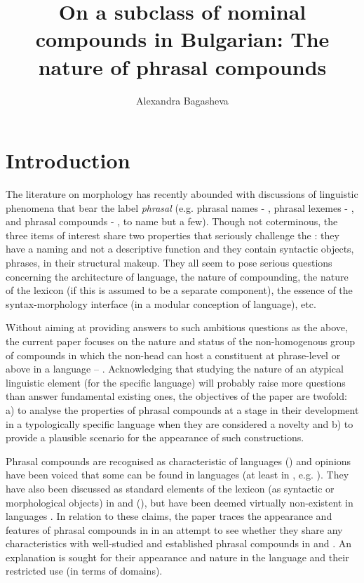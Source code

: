 \documentclass[output=paper]{LSP/langsci}
\author{Alexandra Bagasheva\affiliation{Sofia University}
}
\title{On a subclass of nominal compounds in Bulgarian: The nature of
  phrasal compounds} \shorttitlerunninghead{On a subclass of nominal compounds in Bulgarian}
\begin{document}

\section{Introduction}\label{sec:bagasheva:1}

The literature on morphology has recently abounded with discussions of linguistic phenomena that bear the label \textit{phrasal} (e.g. phrasal names - \citealt{Booij2009wordstructure}, phrasal lexemes - \citealt{Masini2009}, and phrasal compounds - \citealt{Lieber1992,Pafel2015,Trips2016,BagriacikRalli2015}, to name but a few).  Though not coterminous, the three items of interest share two properties that seriously challenge the : they have a naming and not a descriptive function and they contain syntactic objects, phrases, in their structural makeup. They all seem to pose serious questions concerning the architecture of language, the nature of compounding, the nature of the lexicon (if this is assumed to be a separate component), the essence of the syntax-morphology interface (in a modular conception of language), etc. 

Without aiming at providing answers to such ambitious questions as the above, the current paper focuses on the nature and status of the non-homogenous group of compounds in which the non-head can host a constituent at phrase-level or above in a  language – . Acknowledging that studying the nature of an atypical linguistic element (for the specific language) will probably raise more questions than answer fundamental existing ones, the objectives of the paper are twofold: a) to analyse the properties of phrasal compounds at a stage in their development in a typologically specific language when they are considered a novelty and b) to provide a plausible scenario for the appearance of such constructions.

Phrasal compounds are recognised as characteristic of  languages (\citealt{Trips2012,Trips2016}) and opinions have been voiced that some can be found in  languages (at least in , e.g. \citealt{Bisetto2015}). They have also been discussed as standard elements of the lexicon (as syntactic or morphological objects) in  and  (\citealt{BagriacikRalli2015,Ralli2013locus,Ralli2013moderngreek}), but have been deemed virtually non-existent in  languages \citep{Ohnheiser2015}.  In relation to these claims, the paper traces the appearance and features of phrasal compounds in  in an attempt to see whether they share any characteristics with well-studied and established phrasal compounds in  and . An explanation is sought for their appearance and nature in the language and their restricted use (in terms of domains). 
\end{document}
